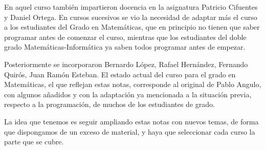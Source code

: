 En aquel curso tambi\'en impartieron docencia en la asignatura Patricio
Cifuentes y Daniel Ortega.  En cursos sucesivos se vio la necesidad  de
adaptar m\'as el curso a los estudiantes del Grado en Matem\'aticas, que en
principio no tienen que saber programar antes de comenzar el curso, mientras que
los estudiantes del doble grado Matem\'aticas-Inform\'atica ya saben todos
programar antes de empezar. 

Posteriormente se incorporaron Bernardo L\'opez, Rafael Hern\'andez, Fernando
Quir\'os, Juan Ram\'on Esteban. El estado
actual del curso para el grado en Matem\'aticas, el que reflejan estas notas, 
corresponde al original de Pablo
Angulo,  con algunos a\~nadidos y con la adaptaci\'on ya mencionada a la
situaci\'on previa, respecto a la programaci\'on,  de muchos de los estudiantes
de grado. 


La idea que tenemos es seguir ampliando estas notas con nuevos temas, de forma
que dispongamos de un exceso de material,  y haya que seleccionar cada curso la
parte que se cubre. 


